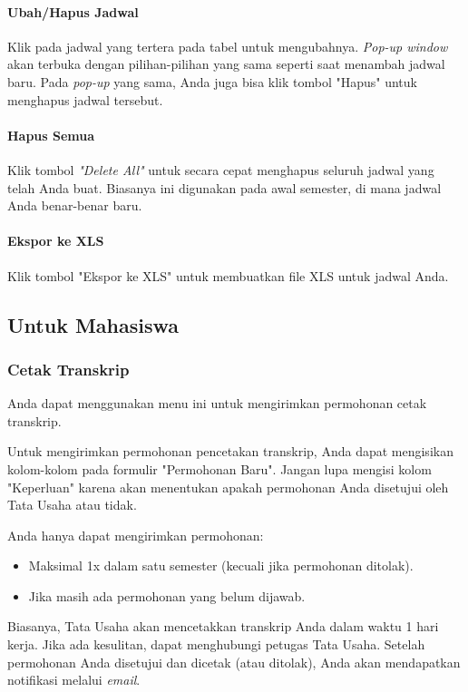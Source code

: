 \paragraph{Ubah/Hapus Jadwal}
\label{sec:bluetape_ubah_hapus_jadwal}
Klik pada jadwal yang tertera pada tabel untuk mengubahnya. \textit{Pop-up window} akan terbuka dengan pilihan-pilihan yang sama seperti saat menambah jadwal baru. Pada \textit{pop-up} yang sama, Anda juga bisa klik tombol "Hapus" untuk menghapus jadwal tersebut.

\paragraph{Hapus Semua}
\label{sec:bluetape_hapus_semua}
Klik tombol \textit{"Delete All"} untuk secara cepat menghapus seluruh jadwal yang telah Anda buat. Biasanya ini digunakan pada awal semester, di mana jadwal Anda benar-benar baru.

\paragraph{Ekspor ke XLS}
\label{sec:bluetape_ekspor_ke_xls}
Klik tombol "Ekspor ke XLS" untuk membuatkan file XLS untuk jadwal Anda.

\subsection{Untuk Mahasiswa}
\label{sec:bluetape_mahasiswa}

\subsubsection{Cetak Transkrip}
\label{sec:bluetape_cetak_transkrip}
Anda dapat menggunakan menu ini untuk mengirimkan permohonan cetak transkrip.

Untuk mengirimkan permohonan pencetakan transkrip, Anda dapat mengisikan kolom-kolom pada formulir "Permohonan Baru". Jangan lupa mengisi kolom "Keperluan" karena akan menentukan apakah permohonan Anda disetujui oleh Tata Usaha atau tidak.

Anda hanya dapat mengirimkan permohonan:
\begin{itemize}
	\item Maksimal 1x dalam satu semester (kecuali jika permohonan ditolak).
	\item Jika masih ada permohonan yang belum dijawab.
\end{itemize}

Biasanya, Tata Usaha akan mencetakkan transkrip Anda dalam waktu 1 hari kerja. Jika ada kesulitan, dapat menghubungi petugas Tata Usaha. Setelah permohonan Anda disetujui dan dicetak (atau ditolak), Anda akan mendapatkan notifikasi melalui \textit{email}.

